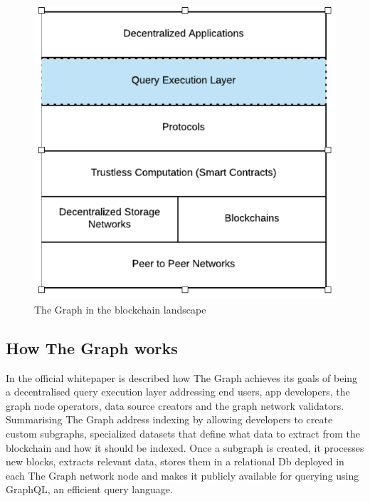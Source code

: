 \documentclass[11pt,a4paper,titlepage]{scrartcl}
\begin{document}
\begin{figure}[ht]
    \centering %
    \includegraphics[scale=0.5]{image/thegraph/positioning.png}
    \caption{The Graph in the blockchain landscape}
    \label{fig:thegraphctx}
\end{figure}



\subsection{How The Graph works}
In the official whitepaper is described how The Graph achieves its goals of being a decentralised query execution layer addressing end users, app developers, the graph node operators, data source creators and the graph network validators. Summarising The Graph address indexing by allowing developers to create custom subgraphs, specialized datasets that define what data to extract from the blockchain and how it should be indexed. Once a subgraph is created, it processes new blocks, extracts relevant data, stores them in a relational Db deployed in each The Graph network node and makes it publicly available for querying using GraphQL, an efficient query language.
\end{document}
